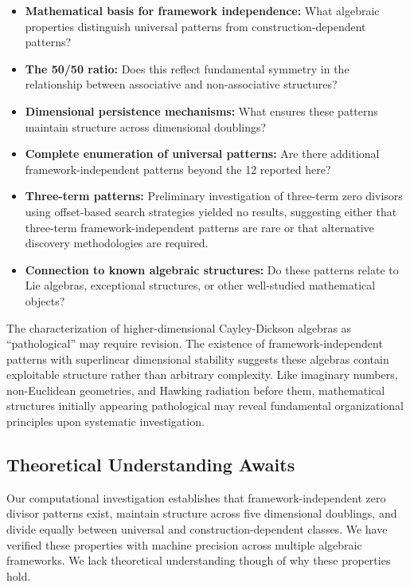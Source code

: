 \documentclass[11pt]{article}
\begin{document}
\begin{itemize}
\item \textbf{Mathematical basis for framework independence:} What algebraic properties distinguish universal patterns from construction-dependent patterns?
\item \textbf{The 50/50 ratio:} Does this reflect fundamental symmetry in the relationship between associative and non-associative structures?
\item \textbf{Dimensional persistence mechanisms:} What ensures these patterns maintain structure across dimensional doublings?
\item \textbf{Complete enumeration of universal patterns:} Are there additional framework-independent patterns beyond the 12 reported here?
\item \textbf{Three-term patterns:} Preliminary investigation of three-term zero divisors using offset-based search strategies yielded no results, suggesting either that three-term framework-independent patterns are rare or that alternative discovery methodologies are required.
\item \textbf{Connection to known algebraic structures:} Do these patterns relate to Lie algebras, exceptional structures, or other well-studied mathematical objects?
\end{itemize}

The characterization of higher-dimensional Cayley-Dickson algebras as ``pathological'' may require revision. The existence of framework-independent patterns with superlinear dimensional stability suggests these algebras contain exploitable structure rather than arbitrary complexity. Like imaginary numbers, non-Euclidean geometries, and Hawking radiation before them, mathematical structures initially appearing pathological may reveal fundamental organizational principles upon systematic investigation.

\subsection{Theoretical Understanding Awaits}

Our computational investigation establishes that framework-independent zero divisor patterns exist, maintain structure across five dimensional doublings, and divide equally between universal and construction-dependent classes. We have verified these properties with machine precision across multiple algebraic frameworks. We lack theoretical understanding though of why these properties hold.
\end{document}
